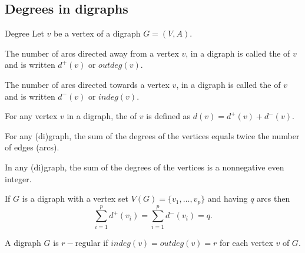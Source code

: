 \documentclass[aspectratio=43]{beamer}
\begin{document}
\subsection{Degrees in digraphs}
\begin{frame}{Degree}
	Let $v$ be a vertex of a digraph $G=(V,A)$.
	\begin{definition}
	The number of arcs directed away from a vertex $v$, in a digraph is called the  of $v$ and is written $d^+(v)$ or $outdeg(v)$.
	\end{definition}
	\begin{definition}
	The number of arcs directed towards a vertex $v$, in a digraph is called the  of $v$ and is written $d^-(v)$ or $indeg(v)$.
	\end{definition}
	\begin{definition}[{Degree}]
	For any vertex $v$ in a digraph, the  of $v$ is defined as $d(v)=d^+(v)+d^-(v)$.
	\end{definition}
\end{frame}



\begin{frame}
	\begin{theorem}
		For any (di)graph, the sum of the degrees of the vertices equals twice the number of edges (arcs).
	\end{theorem}
	\begin{corollary}
		In any (di)graph, the sum of the degrees of the vertices is a nonnegative even integer.
	\end{corollary}
	\begin{theorem}
		If $G$ is a digraph with a vertex set $V(G)=\{v_1, \dots , v_p\}$ and having $q$ arcs then $$\sum_{i=1}^p d^+(v_i)=\sum_{i=1}^p d^-(v_i)=q.$$
	\end{theorem}
\end{frame}

\begin{frame}
	\begin{definition}
		A digraph $G$ is $r-$regular if $indeg(v)=outdeg(v)=r$ for each vertex $v$ of $G$.
\end{definition}\end{frame}



\end{document}
